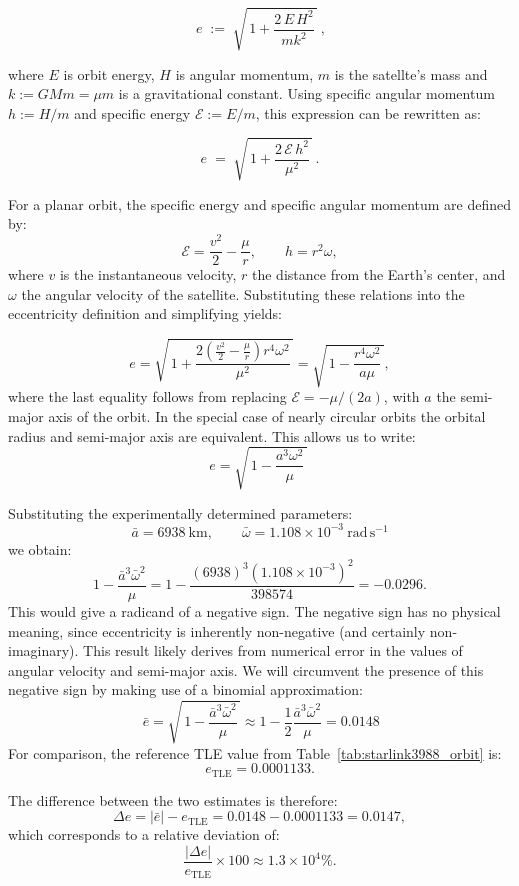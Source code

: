 \documentclass{article}
\begin{document}
\[
\ e \;:=\; \sqrt{\,1 + \dfrac{2\,E\,H^2}{mk^2}\,}\ ,
\]

where $E$ is orbit energy, $H$ is angular momentum, $m$ is the satellte's mass and $k := GMm = \mu m$ is a gravitational constant. Using specific angular momentum $h := H/m$ and specific energy $\mathcal{E}:= E/m$, this expression can be rewritten as:

\[
e \;=\; \sqrt{\,1 + \dfrac{2\,\mathcal{E}\,h^2}{\mu^2}\,}\,.
\]

For a planar orbit, the specific energy and specific angular momentum are defined by:
\[
\mathcal{E} = \frac{v^2}{2} - \frac{\mu}{r}, \qquad h = r^2 \omega,
\]
where $v$ is the instantaneous velocity, $r$ the distance from the Earth’s center, and $\omega$ the angular velocity of the satellite.  
Substituting these relations into the eccentricity definition and simplifying yields:

\[
e = \sqrt{\,1 + \dfrac{2\!\left(\frac{v^2}{2} - \frac{\mu}{r}\right)r^4 \omega^2}{\mu^2}\,} = \sqrt{\,1 - \dfrac{r^4 \omega^2}{a \mu}\,},
\]
where the last equality follows from replacing $\mathcal{E} = -\mu/(2a)$, with $a$ the semi-major axis of the orbit.  In the special case of nearly circular orbits the orbital radius and semi-major axis are equivalent. This allows us to write:
\[
e  = \sqrt{\,1 - \dfrac{a^3 \omega^2}{\mu}\,}\
\]

Substituting the experimentally determined parameters:
\[
\bar{a} = 6938~\mathrm{km}, \qquad
\bar{\omega} = 1.108\times10^{-3}~\mathrm{rad\,s^{-1}}
\]
we obtain:
\[
1- \frac{\bar{a}^{3}\bar{\omega}^{2}}{\mu}
= 1- \frac{(6938)^{3}(1.108\times10^{-3})^{2}}{398574}
= - 0.0296.
\]
This would give a radicand of a negative sign. The negative sign has no physical meaning, since eccentricity is inherently non-negative (and certainly non-imaginary). This result likely derives from numerical error in the values of angular velocity and semi-major axis. We will circumvent the presence of this negative sign by making use of a binomial approximation:
\[
\,\bar{e} = \sqrt{\,1 - \dfrac{\bar{a}^3 \bar{\omega}^2}{\mu}\,} \approx 1 - \frac{1}{2}\dfrac{\bar{a}^3 \bar{\omega}^2}{\mu}  = 0.0148
\]
For comparison, the reference TLE value from Table~\ref{tab:starlink3988_orbit} is:
\[
 \,e_{\mathrm{TLE}} = 0.0001133.\,
\]

The difference between the two estimates is therefore:
\[
\Delta e = |\bar{e}| - e_{\mathrm{TLE}} = 0.0148 - 0.0001133 = 0.0147,
\]
which corresponds to a relative deviation of:
\[
\frac{|\Delta e|}{e_{\mathrm{TLE}}}\times100 \approx 1.3\times10^{4}\%.
\]
\end{document}
